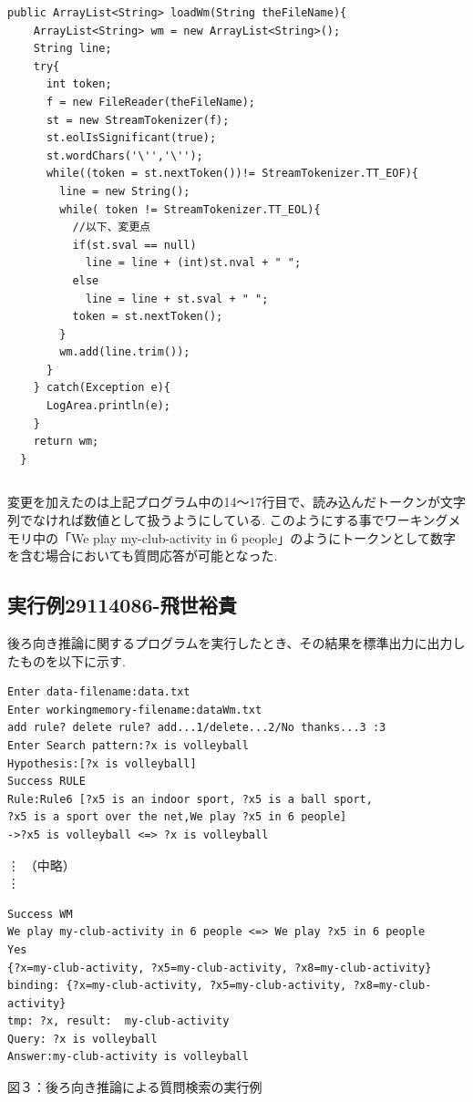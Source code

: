 \documentclass{jarticle}
\begin{document}
\begin{lstlisting}[caption=loadWmメソッド]
  public ArrayList<String> loadWm(String theFileName){
    ArrayList<String> wm = new ArrayList<String>();
    String line;
    try{
      int token;
      f = new FileReader(theFileName);
      st = new StreamTokenizer(f);
      st.eolIsSignificant(true);
      st.wordChars('\'','\'');
      while((token = st.nextToken())!= StreamTokenizer.TT_EOF){
        line = new String();
        while( token != StreamTokenizer.TT_EOL){
          //以下、変更点
          if(st.sval == null)
            line = line + (int)st.nval + " ";
          else
            line = line + st.sval + " ";
          token = st.nextToken();
        }
        wm.add(line.trim());
      }
    } catch(Exception e){
      LogArea.println(e);
    }
    return wm;
  }

\end{lstlisting}

\begin{verbatim}

\end{verbatim}
変更を加えたのは上記プログラム中の14〜17行目で、読み込んだトークンが文字列でなければ数値として扱うようにしている.
このようにする事でワーキングメモリ中の「We play my-club-activity in 6 people」のようにトークンとして数字を含む場合においても質問応答が可能となった.

\subsection{実行例29114086-飛世裕貴}
後ろ向き推論に関するプログラムを実行したとき、その結果を標準出力に出力したものを以下に示す.\\

\begin{screen}
\begin{verbatim}
Enter data-filename:data.txt
Enter workingmemory-filename:dataWm.txt
add rule? delete rule? add...1/delete...2/No thanks...3 :3
Enter Search pattern:?x is volleyball
Hypothesis:[?x is volleyball]
Success RULE
Rule:Rule6 [?x5 is an indoor sport, ?x5 is a ball sport, 
?x5 is a sport over the net,We play ?x5 in 6 people]
->?x5 is volleyball <=> ?x is volleyball
\end{verbatim}
\vdots
（中略）\\
\vdots
\begin{verbatim}
Success WM
We play my-club-activity in 6 people <=> We play ?x5 in 6 people
Yes
{?x=my-club-activity, ?x5=my-club-activity, ?x8=my-club-activity}
binding: {?x=my-club-activity, ?x5=my-club-activity, ?x8=my-club-activity}
tmp: ?x, result:  my-club-activity
Query: ?x is volleyball
Answer:my-club-activity is volleyball
\end{verbatim}
\end{screen}
\begin{center}
図３：後ろ向き推論による質問検索の実行例\\
\end{center}
\end{document}
